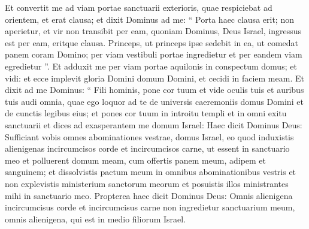 \begin{biblechapter}
\begin{biblechapter}
\begin{biblechapter}
\begin{biblechapter}
\begin{biblechapter}
\begin{biblechapter}
\begin{biblechapter}
\begin{biblechapter}
\begin{biblechapter}
\begin{biblechapter}
\begin{biblechapter}
\begin{biblechapter}
\begin{biblechapter}
\begin{biblechapter}
\begin{biblechapter}
\begin{biblechapter}
\begin{biblechapter}
\begin{biblechapter}
\begin{biblechapter}
\begin{biblechapter}
\begin{biblechapter}
\begin{biblechapter}
\begin{biblechapter}
\begin{biblechapter}
\begin{biblechapter}
\begin{biblechapter}
\begin{biblechapter}
\begin{biblechapter}
\begin{biblechapter}
\begin{biblechapter}
\begin{biblechapter}
\begin{biblechapter}
\begin{biblechapter}
\begin{biblechapter}
\begin{biblechapter}
\begin{biblechapter}
\begin{biblechapter}
\begin{biblechapter}
\begin{biblechapter}
\begin{biblechapter}
\begin{biblechapter}
\begin{biblechapter}
\begin{biblechapter}
\begin{biblechapter}
\verse Et convertit me ad viam portae sanctuarii exterioris, quae respiciebat ad orientem, et erat clausa; 
\verse et dixit Dominus ad me: “ Porta haec clausa erit; non aperietur, et vir non transibit per eam, quoniam Dominus, Deus Israel, ingressus est per eam, eritque clausa. 
\verse Princeps, ut princeps ipse sedebit in ea, ut comedat panem coram Domino; per viam vestibuli portae ingredietur et per eandem viam egredietur ”.
 \verse Et adduxit me per viam portae aquilonis in conspectum domus; et vidi: et ecce implevit gloria Domini domum Domini, et cecidi in faciem meam. 
\verse Et dixit ad me Dominus: “ Fili hominis, pone cor tuum et vide oculis tuis et auribus tuis audi omnia, quae ego loquor ad te de universis caeremoniis domus Domini et de cunctis legibus eius; et pones cor tuum in introitu templi et in omni exitu sanctuarii 
\verse et dices ad exasperantem me domum Israel: Haec dicit Dominus Deus: Sufficiant vobis omnes abominationes vestrae, domus Israel, 
\verse eo quod induxistis alienigenas incircumcisos corde et incircumcisos carne, ut essent in sanctuario meo et polluerent domum meam, cum offertis panem meum, adipem et sanguinem; et dissolvistis pactum meum in omnibus abominationibus vestris 
\verse et non explevistis ministerium sanctorum meorum et posuistis illos ministrantes mihi in sanctuario meo. Propterea 
\verse haec dicit Dominus Deus: Omnis alienigena incircumcisus corde et incircumcisus carne non ingredietur sanctuarium meum, omnis alienigena, qui est in medio filiorum Israel.

\end{biblechapter}
\end{biblechapter}
\end{biblechapter}
\end{biblechapter}
\end{biblechapter}
\end{biblechapter}
\end{biblechapter}
\end{biblechapter}
\end{biblechapter}
\end{biblechapter}
\end{biblechapter}
\end{biblechapter}
\end{biblechapter}
\end{biblechapter}
\end{biblechapter}
\end{biblechapter}
\end{biblechapter}
\end{biblechapter}
\end{biblechapter}
\end{biblechapter}
\end{biblechapter}
\end{biblechapter}
\end{biblechapter}
\end{biblechapter}
\end{biblechapter}
\end{biblechapter}
\end{biblechapter}
\end{biblechapter}
\end{biblechapter}
\end{biblechapter}
\end{biblechapter}
\end{biblechapter}
\end{biblechapter}
\end{biblechapter}
\end{biblechapter}
\end{biblechapter}
\end{biblechapter}
\end{biblechapter}
\end{biblechapter}
\end{biblechapter}
\end{biblechapter}
\end{biblechapter}
\end{biblechapter}
\end{biblechapter}
